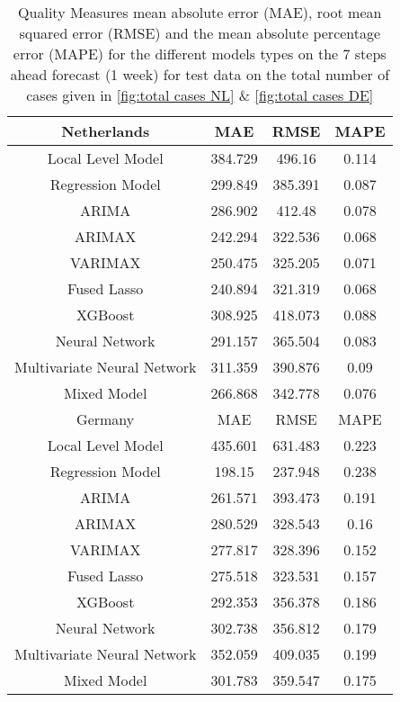 \begin{table}[]
    \centering
    \begin{tabular}{|c|c c c|}\hline
        Netherlands & MAE & RMSE & MAPE\\\hline
        Local Level Model & 384.729  & 496.16 & 0.114\\
        Regression Model & 299.849 & 385.391 & 0.087\\
        ARIMA & 286.902 & 412.48 & 0.078\\
        ARIMAX & 242.294 & 322.536 & 0.068\\
        VARIMAX & 250.475 & 325.205 & 0.071\\
        Fused Lasso & 240.894 & 321.319 & 0.068\\
        XGBoost & 308.925 & 418.073 & 0.088\\
        Neural Network & 291.157 & 365.504 & 0.083\\
        Multivariate Neural Network & 311.359 & 390.876 & 0.09\\
        Mixed Model & 266.868 & 342.778 & 0.076\\\hline\hline
        Germany & MAE & RMSE & MAPE\\\hline
        Local Level Model & 435.601 & 631.483 & 0.223\\
        Regression Model & 198.15 & 237.948 & 0.238\\
        ARIMA & 261.571 & 393.473 & 0.191\\
        ARIMAX & 280.529 & 328.543 & 0.16\\
        VARIMAX & 277.817 & 328.396 & 0.152\\
        Fused Lasso & 275.518 & 323.531 & 0.157\\
        XGBoost & 292.353 & 356.378 & 0.186\\
        Neural Network & 302.738 & 356.812 & 0.179\\
        Multivariate Neural Network & 352.059 & 409.035 & 0.199\\
        Mixed Model & 301.783 & 359.547 & 0.175\\\hline  
    \end{tabular}
    \caption{Quality Measures mean absolute error (MAE), root mean squared error (RMSE) and the mean absolute percentage error (MAPE) for the different models types on the 7 steps ahead forecast (1 week) for test data on the total number of cases given in \autoref{fig:total cases NL} \& \ref{fig:total cases DE}}
    \label{tab:1 week ahead}
\end{table}

